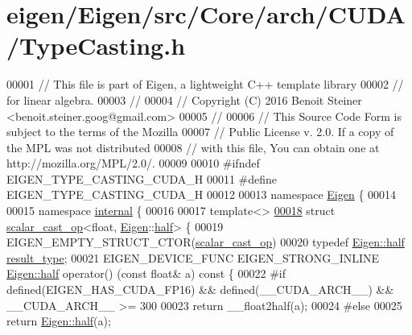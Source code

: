 \hypertarget{eigen_2_eigen_2src_2_core_2arch_2_c_u_d_a_2_type_casting_8h_source}{}\section{eigen/\+Eigen/src/\+Core/arch/\+C\+U\+D\+A/\+Type\+Casting.h}
\label{eigen_2_eigen_2src_2_core_2arch_2_c_u_d_a_2_type_casting_8h_source}

\begin{DoxyCode}
00001 \textcolor{comment}{// This file is part of Eigen, a lightweight C++ template library}
00002 \textcolor{comment}{// for linear algebra.}
00003 \textcolor{comment}{//}
00004 \textcolor{comment}{// Copyright (C) 2016 Benoit Steiner <benoit.steiner.goog@gmail.com>}
00005 \textcolor{comment}{//}
00006 \textcolor{comment}{// This Source Code Form is subject to the terms of the Mozilla}
00007 \textcolor{comment}{// Public License v. 2.0. If a copy of the MPL was not distributed}
00008 \textcolor{comment}{// with this file, You can obtain one at http://mozilla.org/MPL/2.0/.}
00009 
00010 \textcolor{preprocessor}{#ifndef EIGEN\_TYPE\_CASTING\_CUDA\_H}
00011 \textcolor{preprocessor}{#define EIGEN\_TYPE\_CASTING\_CUDA\_H}
00012 
00013 \textcolor{keyword}{namespace }\hyperlink{namespace_eigen}{Eigen} \{
00014 
00015 \textcolor{keyword}{namespace }\hyperlink{namespaceinternal}{internal} \{
00016 
00017 \textcolor{keyword}{template}<>
\hyperlink{struct_eigen_1_1internal_1_1scalar__cast__op_3_01float_00_01_eigen_1_1half_01_4}{00018} \textcolor{keyword}{struct }\hyperlink{struct_eigen_1_1internal_1_1scalar__cast__op}{scalar\_cast\_op}<float, \hyperlink{namespace_eigen}{Eigen}::\hyperlink{struct_eigen_1_1half}{half}> \{
00019   EIGEN\_EMPTY\_STRUCT\_CTOR(\hyperlink{struct_eigen_1_1internal_1_1scalar__cast__op}{scalar\_cast\_op})
00020   \textcolor{keyword}{typedef} \hyperlink{struct_eigen_1_1half}{Eigen::half} \hyperlink{struct_eigen_1_1half}{result\_type};
00021   EIGEN\_DEVICE\_FUNC EIGEN\_STRONG\_INLINE \hyperlink{struct_eigen_1_1half}{Eigen::half} operator() (\textcolor{keyword}{const} \textcolor{keywordtype}{float}& a)\textcolor{keyword}{ const }\{
00022 \textcolor{preprocessor}{    #if defined(EIGEN\_HAS\_CUDA\_FP16) && defined(\_\_CUDA\_ARCH\_\_) && \_\_CUDA\_ARCH\_\_ >= 300}
00023       \textcolor{keywordflow}{return} \_\_float2half(a);
00024 \textcolor{preprocessor}{    #else}
00025       \textcolor{keywordflow}{return} \hyperlink{struct_eigen_1_1half}{Eigen::half}(a);

\end{DoxyCode}
